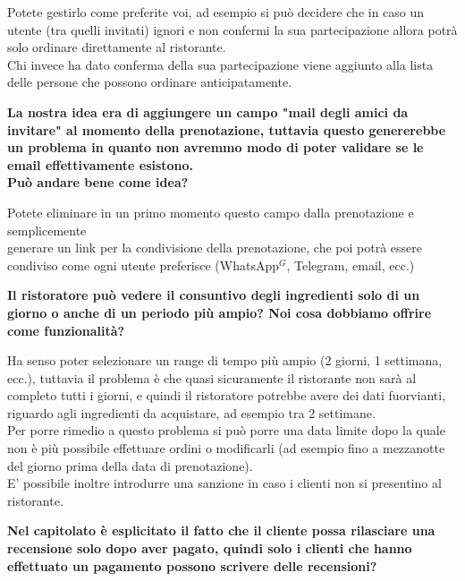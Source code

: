 \documentclass[a4paper, 11pt]{article}
\begin{document}
Potete gestirlo come preferite voi, ad esempio si può decidere che in caso un utente (tra quelli invitati) ignori e non confermi la sua partecipazione allora potrà solo ordinare direttamente al ristorante. \\
Chi invece ha dato conferma della sua partecipazione viene aggiunto alla lista delle persone che possono ordinare anticipatamente. \\ \newline


\textbf{La nostra idea era di aggiungere un campo "mail degli amici da invitare" al momento della prenotazione, tuttavia questo genererebbe un problema in quanto non avremmo modo di poter validare se le email effettivamente esistono. \\
Può andare bene come idea?}

Potete eliminare in un primo momento questo campo dalla prenotazione e semplicemente \\generare un link per la condivisione della prenotazione, che poi potrà essere condiviso come ogni utente preferisce (WhatsApp$^{G}$, Telegram, email, ecc.) \\ \newline


\textbf{Il ristoratore può vedere il consuntivo degli ingredienti solo di un giorno o anche di un periodo più ampio? Noi cosa dobbiamo offrire come funzionalità?}

Ha senso poter selezionare un range di tempo più ampio (2 giorni, 1 settimana, ecc.), tuttavia il problema è che quasi sicuramente il ristorante non sarà al completo tutti i giorni, e quindi il ristoratore potrebbe avere dei dati fuorvianti, riguardo agli ingredienti da acquistare, ad esempio tra 2 settimane. \\
Per porre rimedio a questo problema si può porre una data limite dopo la quale non è più possibile effettuare ordini o modificarli (ad esempio fino a mezzanotte del giorno prima della data di prenotazione). \\ 
E' possibile inoltre introdurre una sanzione in caso i clienti non si presentino al ristorante. \\ \newline

\pagebreak

\textbf{Nel capitolato è esplicitato il fatto che il cliente possa rilasciare una recensione solo dopo aver pagato, quindi solo i clienti che hanno effettuato un pagamento possono scrivere delle recensioni?}
 
\end{document}

